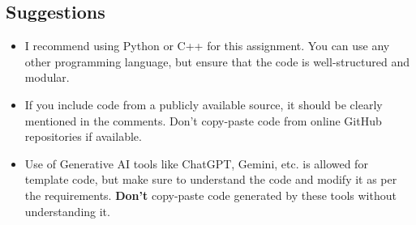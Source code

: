 \documentclass[12pt]{extarticle}
\begin{document}
\subsection*{Suggestions}
\begin{itemize}
    \item I recommend using Python or C++ for this assignment. You can use any other programming language, but ensure that the code is well-structured and modular.
    \item If you include code from a publicly available source, it should be clearly mentioned in the comments. Don't copy-paste code from online GitHub repositories if available.
    \item Use of Generative AI tools like ChatGPT, Gemini, etc. is allowed for template code, but make sure to understand the code and modify it as per the requirements. \textbf{Don't} copy-paste code generated by these tools without understanding it.
\end{itemize}
\hrulefill
\end{document}
